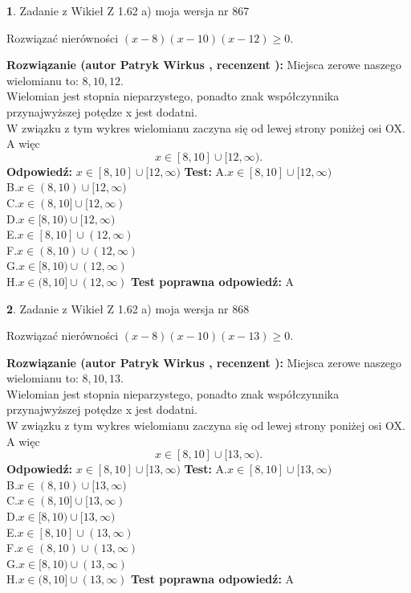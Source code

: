 \documentclass[12pt, a4paper]{article}
\theoremstyle{definition} %
\newtheorem{zad}{}
\newcommand{\zadStart}[1]{\begin{zad}#1\newline}
\newcommand{\zadStop}{\end{zad}}
\newcommand{\rozwStart}[2]{\noindent \textbf{Rozwiązanie (autor #1 , recenzent #2): }\newline}
\newcommand{\rozwStop}{\newline}
\newcommand{\odpStart}{\noindent \textbf{Odpowiedź:}\newline}
\newcommand{\odpStop}{\newline}
\newcommand{\testStart}{\noindent \textbf{Test:}\newline}
\newcommand{\testStop}{\newline}
\newcommand{\kluczStart}{\noindent \textbf{Test poprawna odpowiedź:}\newline}
\newcommand{\kluczStop}{\newline}
\begin{document}
\zadStart{Zadanie z Wikieł Z 1.62 a) moja wersja nr 867}

Rozwiązać nierówności $(x-8)(x-10)(x-12)\ge0$.
\zadStop
\rozwStart{Patryk Wirkus}{}
Miejsca zerowe naszego wielomianu to: $8, 10, 12$.\\
Wielomian jest stopnia nieparzystego, ponadto znak współczynnika przy\linebreak najwyższej potędze x jest dodatni.\\ W związku z tym wykres wielomianu zaczyna się od lewej strony poniżej osi OX. A więc $$x \in [8,10] \cup [12,\infty).$$
\rozwStop
\odpStart
$x \in [8,10] \cup [12,\infty)$
\odpStop
\testStart
A.$x \in [8,10] \cup [12,\infty)$\\
B.$x \in (8,10) \cup [12,\infty)$\\
C.$x \in (8,10] \cup [12,\infty)$\\
D.$x \in [8,10) \cup [12,\infty)$\\
E.$x \in [8,10] \cup (12,\infty)$\\
F.$x \in (8,10) \cup (12,\infty)$\\
G.$x \in [8,10) \cup (12,\infty)$\\
H.$x \in (8,10] \cup (12,\infty)$
\testStop
\kluczStart
A
\kluczStop



\zadStart{Zadanie z Wikieł Z 1.62 a) moja wersja nr 868}

Rozwiązać nierówności $(x-8)(x-10)(x-13)\ge0$.
\zadStop
\rozwStart{Patryk Wirkus}{}
Miejsca zerowe naszego wielomianu to: $8, 10, 13$.\\
Wielomian jest stopnia nieparzystego, ponadto znak współczynnika przy\linebreak najwyższej potędze x jest dodatni.\\ W związku z tym wykres wielomianu zaczyna się od lewej strony poniżej osi OX. A więc $$x \in [8,10] \cup [13,\infty).$$
\rozwStop
\odpStart
$x \in [8,10] \cup [13,\infty)$
\odpStop
\testStart
A.$x \in [8,10] \cup [13,\infty)$\\
B.$x \in (8,10) \cup [13,\infty)$\\
C.$x \in (8,10] \cup [13,\infty)$\\
D.$x \in [8,10) \cup [13,\infty)$\\
E.$x \in [8,10] \cup (13,\infty)$\\
F.$x \in (8,10) \cup (13,\infty)$\\
G.$x \in [8,10) \cup (13,\infty)$\\
H.$x \in (8,10] \cup (13,\infty)$
\testStop
\kluczStart
A
\kluczStop
\end{document}
